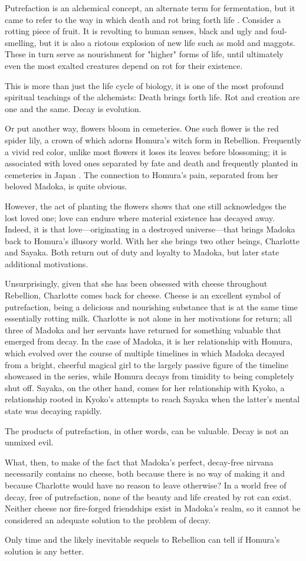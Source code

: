 Putrefaction is an alchemical concept, an alternate term for fermentation, but it came to refer to the way in which death and rot bring forth life \cite{ref111}. Consider a rotting piece of fruit. It is revolting to human senses, black and ugly and foul-smelling, but it is also a riotous explosion of new life such as mold and maggots. These in turn serve as nourishment for "higher" forms of life, until ultimately even the most exalted creatures depend on rot for their existence.

This is more than just the life cycle of biology, it is one of the most profound spiritual teachings of the alchemists: Death brings forth life. Rot and creation are one and the same. Decay is evolution.

Or put another way, flowers bloom in cemeteries. One such flower is the red spider lily, a crown of which adorns Homura's witch form in Rebellion. Frequently a vivid red color, unlike most flowers it loses its leaves before blossoming; it is associated with loved ones separated by fate and death and frequently planted in cemeteries in Japan \cite{ref112}. The connection to Homura's pain, separated from her beloved Madoka, is quite obvious.

However, the act of planting the flowers shows that one still acknowledges the lost loved one; love can endure where material existence has decayed away. Indeed, it is that love—originating in a destroyed universe—that brings Madoka back to Homura's illusory world. With her she brings two other beings, Charlotte and Sayaka. Both return out of duty and loyalty to Madoka, but later state additional motivations.

Unsurprisingly, given that she has been obsessed with cheese throughout Rebellion, Charlotte comes back for cheese. Cheese is an excellent symbol of putrefaction, being a delicious and nourishing substance that is at the same time essentially rotting milk. Charlotte is not alone in her motivations for return; all three of Madoka and her servants have returned for something valuable that emerged from decay. In the case of Madoka, it is her relationship with Homura, which evolved over the course of multiple timelines in which Madoka decayed from a bright, cheerful magical girl to the largely passive figure of the timeline showcased in the series, while Homura decays from timidity to being completely shut off. Sayaka, on the other hand, comes for her relationship with Kyoko, a relationship rooted in Kyoko's attempts to reach Sayaka when the latter's mental state was decaying rapidly.

The products of putrefaction, in other words, can be valuable. Decay is not an unmixed evil.

What, then, to make of the fact that Madoka's perfect, decay-free nirvana necessarily contains no cheese, both because there is no way of making it and because Charlotte would have no reason to leave otherwise? In a world free of decay, free of putrefaction, none of the beauty and life created by rot can exist. Neither cheese nor fire-forged friendships exist in Madoka's realm, so it cannot be considered an adequate solution to the problem of decay.

Only time and the likely inevitable sequels to Rebellion can tell if Homura's solution is any better.
